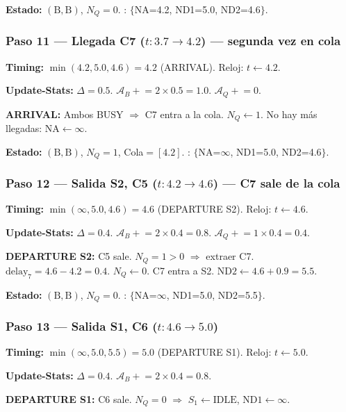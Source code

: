 \documentclass[11pt, letterpaper]{article}
\begin{document}
\textbf{Estado:} $(\text{B}, \text{B})$, $N_Q = 0$. \quad \FEL: $\{$NA=4.2, ND1=5.0, ND2=4.6$\}$.

\subsubsection*{Paso 11 --- Llegada C7 ($t: 3.7 \to 4.2$) --- \textcolor{rojoclaro}{segunda vez en cola}}

\textbf{Timing:} $\min(4.2, 5.0, 4.6) = 4.2$ (ARRIVAL). Reloj: $t \leftarrow 4.2$.

\textbf{Update-Stats:} $\Delta = 0.5$. $\mathcal{A}_B \mathrel{+}= 2 \times 0.5 = 1.0$. $\mathcal{A}_Q \mathrel{+}= 0$.

\textbf{ARRIVAL:} Ambos BUSY $\Rightarrow$ C7 entra a la cola. $N_Q \leftarrow 1$. No hay más llegadas: $\text{NA} \leftarrow \infty$.

\textbf{Estado:} $(\text{B}, \text{B})$, $N_Q = 1$, Cola$= [4.2]$. \quad \FEL: $\{$NA=$\infty$, ND1=5.0, ND2=4.6$\}$.

\subsubsection*{Paso 12 --- Salida S2, C5 ($t: 4.2 \to 4.6$) --- C7 sale de la cola}

\textbf{Timing:} $\min(\infty, 5.0, 4.6) = 4.6$ (DEPARTURE S2). Reloj: $t \leftarrow 4.6$.

\textbf{Update-Stats:} $\Delta = 0.4$. $\mathcal{A}_B \mathrel{+}= 2 \times 0.4 = 0.8$. $\mathcal{A}_Q \mathrel{+}= 1 \times 0.4 = 0.4$.

\textbf{DEPARTURE S2:} C5 sale. $N_Q = 1 > 0$ $\Rightarrow$ extraer C7. $\text{delay}_7 = 4.6 - 4.2 = 0.4$. $N_Q \leftarrow 0$. C7 entra a S2. $\text{ND2} \leftarrow 4.6 + 0.9 = 5.5$.

\textbf{Estado:} $(\text{B}, \text{B})$, $N_Q = 0$. \quad \FEL: $\{$NA=$\infty$, ND1=5.0, ND2=5.5$\}$.

\subsubsection*{Paso 13 --- Salida S1, C6 ($t: 4.6 \to 5.0$)}

\textbf{Timing:} $\min(\infty, 5.0, 5.5) = 5.0$ (DEPARTURE S1). Reloj: $t \leftarrow 5.0$.

\textbf{Update-Stats:} $\Delta = 0.4$. $\mathcal{A}_B \mathrel{+}= 2 \times 0.4 = 0.8$.

\textbf{DEPARTURE S1:} C6 sale. $N_Q = 0$ $\Rightarrow$ $S_1 \leftarrow \text{IDLE}$, $\text{ND1} \leftarrow \infty$.
\end{document}
